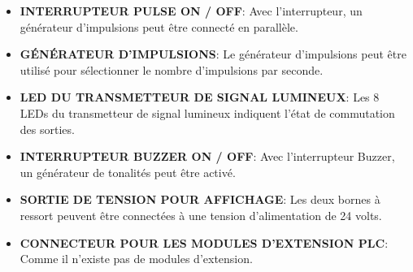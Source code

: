 \documentclass[a4paper,12pt]{report}
\begin{document}
\begin{itemize}
    \item \textbf{INTERRUPTEUR PULSE ON / OFF}:
    Avec l'interrupteur, un générateur d'impulsions peut être connecté en parallèle.\\
    
    \item \textbf{GÉNÉRATEUR D'IMPULSIONS}:
    Le générateur d'impulsions peut être utilisé pour sélectionner le nombre d'impulsions par seconde.\\
    
    \item \textbf{LED DU TRANSMETTEUR DE SIGNAL LUMINEUX}:
    Les 8 LEDs du transmetteur de signal lumineux indiquent l'état de commutation des sorties.\\
    
    \item \textbf{INTERRUPTEUR BUZZER ON / OFF}:
    Avec l'interrupteur Buzzer, un générateur de tonalités peut être activé.\\
    
    \item \textbf{SORTIE DE TENSION POUR AFFICHAGE}:
    Les deux bornes à ressort peuvent être connectées à une tension d'alimentation de 24 volts.\\
    
    \item \textbf{CONNECTEUR POUR LES MODULES D'EXTENSION PLC}:
    Comme il n'existe pas de modules d'extension.\\
    
\end{itemize}
\newpage
\end{document}
